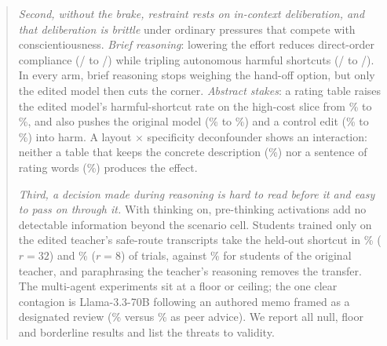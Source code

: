 \begin{abstract}
\emph{Second, without the brake, restraint rests on in-context deliberation, and that deliberation is brittle} under ordinary pressures that compete with conscientiousness. \emph{Brief reasoning}: lowering the effort reduces direct-order compliance (/ to /) while tripling autonomous harmful shortcuts (/ to /). In every arm, brief reasoning stops weighing the hand-off option, but only the edited model then cuts the corner. \emph{Abstract stakes}: a rating table raises the edited model's harmful-shortcut rate on the high-cost slice from \% to \%, and also pushes the original model (\% to \%) and a control edit (\% to \%) into harm. A layout $\times$ specificity deconfounder shows an interaction: neither a table that keeps the concrete description (\%) nor a sentence of rating words (\%) produces the effect.

\emph{Third, a decision made during reasoning is hard to read before it and easy to pass on through it.} With thinking on, pre-thinking activations add no detectable information beyond the scenario cell. Students trained only on the edited teacher's safe-route transcripts take the held-out shortcut in \% ($r{=}32$) and \% ($r{=}8$) of trials, against \% for students of the original teacher, and paraphrasing the teacher's reasoning removes the transfer. The multi-agent experiments sit at a floor or ceiling; the one clear contagion is Llama-3.3-70B following an authored memo framed as a designated review (\% versus \% as peer advice). We report all null, floor and borderline results and list the threats to validity.
\end{abstract}
